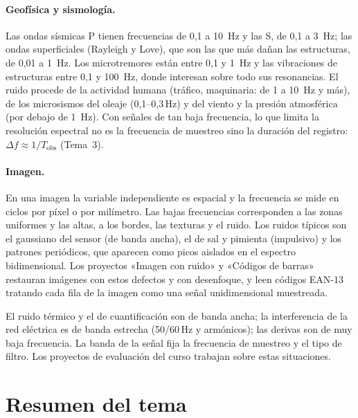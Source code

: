 \documentclass[11pt,a4paper]{scrartcl}
\begin{document}
\paragraph{Geofísica y sismología.} Las ondas sísmicas P tienen frecuencias de 0,1 a \SI{10}{\hertz} y las S, de 0,1 a \SI{3}{\hertz}; las ondas superficiales (Rayleigh y Love), que son las que más dañan las estructuras, de 0,01 a \SI{1}{\hertz}. Los microtremores están entre 0,1 y \SI{1}{\hertz} y las vibraciones de estructuras entre 0,1 y \SI{100}{\hertz}, donde interesan sobre todo sus resonancias. El ruido procede de la actividad humana (tráfico, maquinaria: de 1 a \SI{10}{\hertz} y más), de los microsismos del oleaje (0,1–0,3\,Hz) y del viento y la presión atmosférica (por debajo de \SI{1}{\hertz}). Con señales de tan baja frecuencia, lo que limita la resolución espectral no es la frecuencia de muestreo sino la duración del registro: $\Delta f\approx1/T_{\mathrm{obs}}$ (Tema~3).

\paragraph{Imagen.} En una imagen la variable independiente es espacial y la frecuencia se mide en ciclos por píxel o por milímetro. Las bajas frecuencias corresponden a las zonas uniformes y las altas, a los bordes, las texturas y el ruido. Los ruidos típicos son el gaussiano del sensor (de banda ancha), el de sal y pimienta (impulsivo) y los patrones periódicos, que aparecen como picos aislados en el espectro bidimensional. Los proyectos «Imagen con ruido» y «Códigos de barras» restauran imágenes con estos defectos y con desenfoque, y leen códigos EAN-13 tratando cada fila de la imagen como una señal unidimensional muestreada.

\begin{nota}[En resumen]
  El ruido térmico y el de cuantificación son de banda ancha; la interferencia de la red eléctrica es de banda estrecha (50/60\,Hz y armónicos); las derivas son de muy baja frecuencia. La banda de la señal fija la frecuencia de muestreo y el tipo de filtro. Los proyectos de evaluación del curso trabajan sobre estas situaciones.
\end{nota}

\section*{Resumen del tema}
\end{document}
